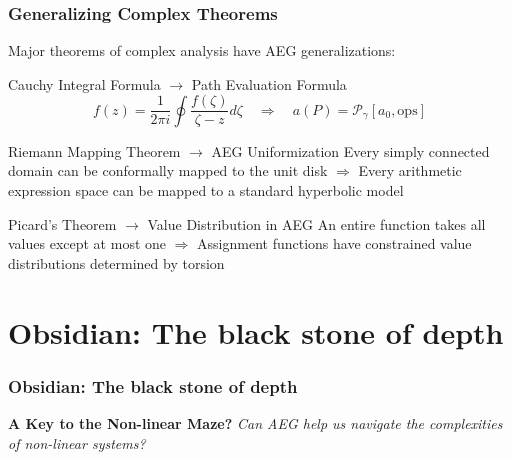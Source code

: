 \documentclass[aspectratio=169]{beamer}
\begin{document}
\begin{frame}
    \frametitle{Generalizing Complex Theorems}
    Major theorems of complex analysis have AEG generalizations:
    
    \begin{block}{Cauchy Integral Formula $\to$ Path Evaluation Formula}
    \[
        f(z) = \frac{1}{2\pi i} \oint \frac{f(\zeta)}{\zeta - z} d\zeta
        \quad \Rightarrow \quad
        a(P) = \mathcal{P}_\gamma[a_0, \text{ops}]
    \]
    \end{block}
    
    \begin{block}{Riemann Mapping Theorem $\to$ AEG Uniformization}
    Every simply connected domain can be conformally mapped to the unit disk
    $\Rightarrow$
    Every arithmetic expression space can be mapped to a standard hyperbolic model
    \end{block}
    
    \begin{block}{Picard's Theorem $\to$ Value Distribution in AEG}
    An entire function takes all values except at most one
    $\Rightarrow$
    Assignment functions have constrained value distributions determined by torsion
    \end{block}
\end{frame}


\section{Obsidian: The black stone of depth}

\begin{frame}
    \frametitle{Obsidian: The black stone of depth}
    \begin{center}
        \Large
        \textbf{A Key to the Non-linear Maze?}
        \newline\newline
        \emph{Can AEG help us navigate the complexities of non-linear systems?}
    \end{center}
\end{frame}
\end{document}
